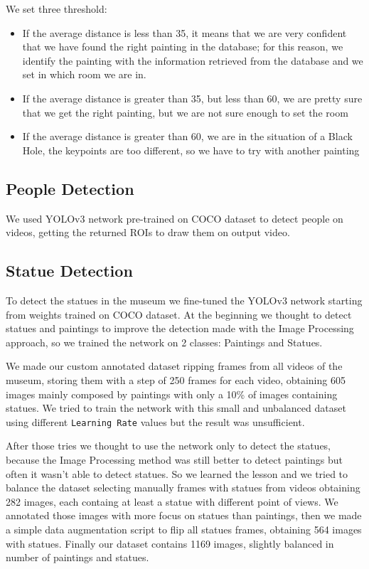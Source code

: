 \documentclass[10pt,twocolumn,letterpaper]{article}
\begin{document}
We set three threshold:
\begin{itemize}
  \item If the average distance is less than 35, it means that we are very confident that we have found the right painting in the database; for this reason, we identify the painting with the information retrieved from the database and we set in which room we are in.
  \item If the average distance is greater than 35, but less than 60, we are pretty sure that we get the right painting, but we are not sure enough to set the room
  \item If the average distance is greater than 60, we are in the situation of a Black Hole, the keypoints are too different, so we have to try with another painting 
\end{itemize}

\subsection{People Detection}

We used YOLOv3 network pre-trained on COCO dataset to detect people on videos, getting the returned
ROIs to draw them on output video.

\subsection{Statue Detection}

To detect the statues in the museum we fine-tuned the YOLOv3 network starting from
weights trained on COCO dataset. At the beginning we thought to detect statues and paintings
to improve the detection made with the Image Processing approach, so we trained the network
on 2 classes: Paintings and Statues.

We made our custom annotated dataset ripping frames from all videos of the museum, storing
them with a step of 250 frames for each video, obtaining 605 images mainly composed by paintings 
with only a 10\% of images containing statues.
We tried to train the network with this small and unbalanced dataset using different {\tt Learning Rate} 
values but the result was unsufficient.

After those tries we thought to use the network only to detect the statues, because the Image Processing
method was still better to detect paintings but often it wasn't able to detect statues.
So we learned the lesson and we tried to balance the dataset selecting manually frames with statues
from videos obtaining 282 images, each containg at least a statue with different point of views.
We annotated those images with more focus on statues than paintings, then we made a simple data 
augmentation script to flip all statues frames, obtaining 564 images with statues.
Finally our dataset contains 1169 images, slightly balanced in number of paintings and statues.
\end{document}
